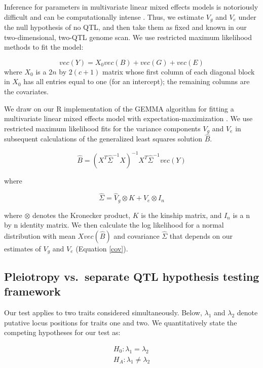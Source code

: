 \documentclass[oneside]{book}\usepackage[]{graphicx}\usepackage[]{color}
\begin{document}
Inference for parameters in multivariate linear mixed effects models
is notoriously difficult and can be computationally intense
\citep{meyer1989restricted,meyer1991estimating}. Thus, we estimate
$V_g$ and $V_e$ under the null hypothesis of no QTL, and then take
them as fixed and known in our two-dimensional, two-QTL genome scan.
We use restricted maximum likelihood methods to fit the
model:

\begin{equation}
vec(Y) = X_0vec(B) + vec(G) + vec(E)
\label{model}
\end{equation}
where $X_0$ is a $2n$ by $2(c + 1)$ matrix whose first column of each
diagonal block in $X_0$ has all entries equal to one (for an intercept); the remaining
columns are the covariates.

We draw on our R implementation \citep{gemma2} of the
GEMMA algorithm for fitting a multivariate linear mixed effects model
with expectation-maximization \citep{zhou2014efficient}. We use
restricted maximum likelihood fits for the variance components $V_g$
and $V_e$ in subsequent calculations of the generalized least squares
solution $\hat B$.

\begin{equation}
    \hat B = (X^T\hat\Sigma^{-1}X)^{-1}X^T\hat\Sigma^{-1}vec(Y)
\end{equation}

\noindent where

\begin{equation}
    \hat\Sigma = \hat V_g \otimes K + \hat V_e \otimes I_n
    \label{cov}
\end{equation}

\noindent where $\otimes$ denotes the Kronecker product, $K$ is the
kinship matrix, and $I_n$ is a n by n
identity matrix. We then calculate the log likelihood for a normal
distribution with mean $X vec(\hat B)$ and covariance $\hat \Sigma$
that depends on our estimates of $V_g$ and $V_e$ (Equation \ref{cov}).

\subsection{Pleiotropy vs.\ separate QTL hypothesis testing framework}

Our test applies to two traits considered simultaneously. Below,
$\lambda_1$ and $\lambda_2$ denote putative locus positions for traits
one and two. We quantitatively state the competing hypotheses for our
test as:

\begin{eqnarray}
H_0: \lambda_1 = \lambda_2 \nonumber\\
H_A: \lambda_1 \neq \lambda_2
\label{eqn:hypotheses}
\end{eqnarray}
\end{document}
